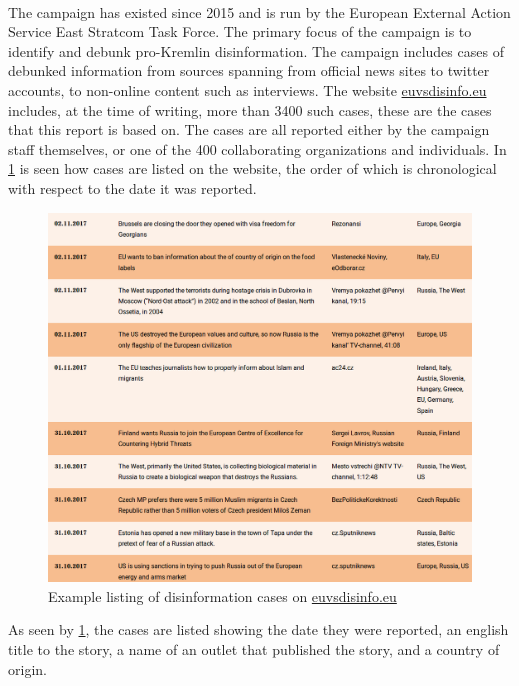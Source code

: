 \documentclass{article}
\begin{document}
\\
The campaign has existed since 2015 and is run by the European External Action Service East Stratcom Task Force. The primary focus of the campaign is to identify and debunk pro-Kremlin disinformation.
The campaign includes cases of debunked information from sources spanning from official news sites to twitter accounts, to non-online content such as interviews. The website \href{https://www.euvsdisinfo.eu}{euvsdisinfo.eu} includes, at the time of writing, more than 3400 such cases, these are the cases that this report is based on. The cases are all reported either by the campaign staff themselves, or one of the 400 collaborating organizations and individuals.
In \cref{fig:cases} is seen how cases are listed on the website, the order of which is chronological with respect to the date it was reported.

\begin{figure}[H]
    \centering
    \caption{Example listing of disinformation cases on \href{https://www.euvsdisinfo.eu}{euvsdisinfo.eu}}
    \label{fig:cases}
    \includegraphics[width=.9\textwidth]{images/example_cases.png}
\end{figure}

As seen by \cref{fig:cases}, the cases are listed showing the date they were reported, an english title to the story, a name of an outlet that published the story, and a country of origin. 
\end{document}
